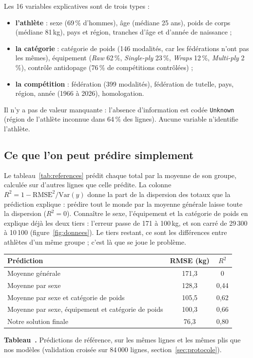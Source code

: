 \documentclass[11pt,a4paper]{article}
\newcommand{\code}[1]{\texttt{\small #1}}
\newcommand{\kg}{\,kg}
\newcounter{fig}
\newenvironment{tableau}{\par\smallskip\noindent\begin{minipage}{\linewidth}\centering}{\end{minipage}\par\smallskip}
\newcounter{tab}
\newcommand{\legende}[2]{\refstepcounter{tab}\label{#1}{\small\textbf{Tableau~\thetab.} #2\par}}
\begin{document}
Les 16 variables explicatives sont de trois types :
\begin{itemize}
\item \textbf{l'athlète} : sexe (69\,\% d'hommes), âge (médiane 25 ans), poids de corps (médiane 81\kg),
pays et région, tranches d'âge et d'année de naissance ;
\item \textbf{la catégorie} : catégorie de poids (146 modalités, car les fédérations n'ont pas les mêmes),
équipement (\emph{Raw} 62\,\%, \emph{Single-ply} 23\,\%, \emph{Wraps} 12\,\%, \emph{Multi-ply} 2\,\%),
contrôle antidopage (76\,\% de compétitions contrôlées) ;
\item \textbf{la compétition} : fédération (399 modalités), fédération de tutelle, pays, région, année
(1966 à 2026), homologation.
\end{itemize}
Il n'y a pas de valeur manquante : l'absence d'information est codée \code{Unknown} (région de l'athlète
inconnue dans 64\,\% des lignes). Aucune variable n'identifie l'athlète.

\subsection{Ce que l'on peut prédire simplement}
Le tableau~\ref{tab:references} prédit chaque total par la moyenne de son groupe, calculée sur d'autres
lignes que celle prédite. La colonne $R^2 = 1 - \mathrm{RMSE}^2/\mathrm{Var}(y)$ donne la part de la dispersion
des totaux que la prédiction explique : prédire tout le monde par la moyenne générale laisse toute la
dispersion ($R^2 = 0$). Connaître le sexe, l'équipement et la catégorie de poids en explique déjà les deux
tiers : l'erreur passe de 171 à 100\kg, et son carré de 29\,300 à 10\,100 (figure~\ref{fig:donnees}). Le tiers
restant, ce sont les différences entre athlètes d'un même groupe ; c'est là que se joue le problème.

\begin{tableau}\small
\begin{tabular}{lcc}
\toprule
Prédiction & RMSE (kg) & $R^2$ \\
\midrule
Moyenne générale & 171,3 & 0 \\
Moyenne par sexe & 128,3 & 0,44 \\
Moyenne par sexe et catégorie de poids & 105,5 & 0,62 \\
Moyenne par sexe, équipement et catégorie de poids & 100,3 & 0,66 \\
Notre solution finale & 76,3 & 0,80 \\
\bottomrule
\end{tabular}\par\vspace{2pt}
\legende{tab:references}{Prédictions de référence, sur les mêmes lignes et les mêmes plis que nos modèles
(validation croisée sur 84\,000 lignes, section~\ref{sec:protocole}).}
\end{tableau}
\end{document}
